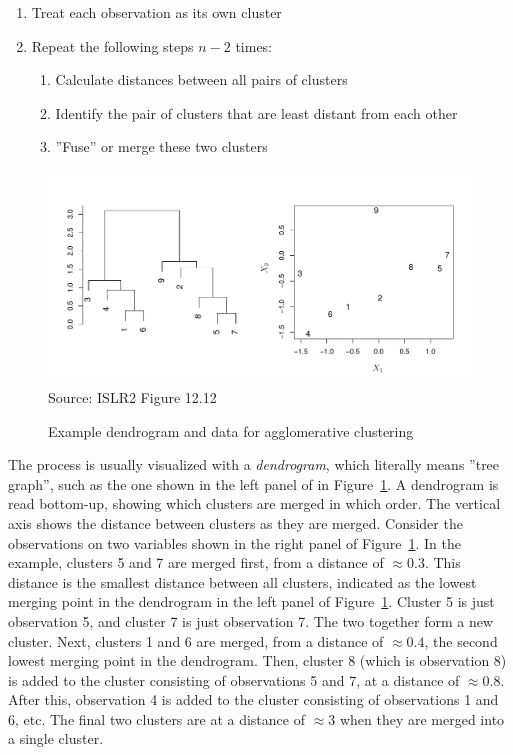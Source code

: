 \begin{enumerate}
   \item Treat each observation as its own cluster
   \item Repeat the following steps $n-2$ times:
   \begin{enumerate}
      \item Calculate distances between all pairs of clusters
      \item Identify the pair of clusters that are least distant from each other
      \item ''Fuse'' or merge these two clusters
   \end{enumerate}
\end{enumerate}

\begin{figure}
\centering
\includegraphics[width=.9\textwidth]{../class11/Figures_Chapters_7-13/Chapter12/12_12.pdf} \\

\scriptsize Source: ISLR2 Figure 12.12
\caption{Example dendrogram and data for agglomerative clustering}
\label{fig:dendro1}
\end{figure}

The process is usually visualized with a \emph{dendrogram}, which literally means ''tree graph'', such as the one shown in the left panel of in Figure~\ref{fig:dendro1}. A dendrogram is read bottom-up, showing which clusters are merged in which order. The vertical axis shows the distance between clusters as they are merged. Consider the observations on two variables shown in the right panel of Figure~\ref{fig:dendro1}. In the example, clusters 5 and 7 are merged first, from a distance of $\approx 0.3$. This distance is the smallest distance between all clusters, indicated as the lowest merging point in the dendrogram in the left panel of Figure~\ref{fig:dendro1}. Cluster 5 is just observation 5, and cluster 7 is just observation 7. The two together form a new cluster. Next, clusters 1 and 6 are merged, from a distance of $\approx 0.4$, the second lowest merging point in the dendrogram. Then, cluster 8 (which is observation 8) is added to the cluster consisting of observations 5 and 7, at a distance of $\approx 0.8$. After this, observation 4 is added to the cluster consisting of observations 1 and 6, etc. The final two clusters are at a distance of $\approx 3$ when they are merged into a single cluster. 


